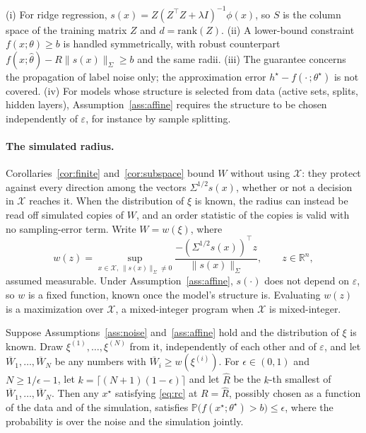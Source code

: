 \begin{remark}
(i) For ridge regression, $s(x) = Z(Z^\top Z + \lambda I)^{-1}\phi(x)$, so $S$
is the column space of the training matrix $Z$ and $d = \mathrm{rank}(Z)$.
(ii) A lower-bound constraint $f(x;\theta) \ge b$ is handled symmetrically,
with robust counterpart $f(x;\hat\theta) - R\|s(x)\|_\Sigma \ge b$ and the same
radii.
(iii) The guarantee concerns the propagation of label noise only; the
approximation error $h^\star - f(\cdot\,;\theta^\star)$ is not covered.
(iv) For models whose structure is selected from data (active sets, splits,
hidden layers), Assumption~\ref{ass:affine} requires the structure to be
chosen independently of $\varepsilon$, for instance by sample splitting.
\end{remark}

\paragraph{The simulated radius.}
Corollaries~\ref{cor:finite} and~\ref{cor:subspace} bound $W$ without using
$\mathcal{X}$: they protect against every direction among the vectors
$\Sigma^{1/2}s(x)$, whether or not a decision in $\mathcal{X}$ reaches it. When
the distribution of $\xi$ is known, the radius can instead be read off
simulated copies of $W$, and an order statistic of the copies is valid with no
sampling-error term. Write $W = w(\xi)$, where
\[
  w(z) = \sup_{x \in \mathcal{X},\, \|s(x)\|_\Sigma \neq 0}
    \frac{-(\Sigma^{1/2}s(x))^\top z}{\|s(x)\|_\Sigma},
  \qquad z \in \mathbb{R}^n ,
\]
assumed measurable. Under Assumption~\ref{ass:affine}, $s(\cdot)$ does not
depend on $\varepsilon$, so $w$ is a fixed function, known once the model's
structure is. Evaluating $w(z)$ is a maximization over $\mathcal{X}$, a
mixed-integer program when $\mathcal{X}$ is mixed-integer.

\begin{proposition}\label{prop:simulated}
Suppose Assumptions~\ref{ass:noise} and~\ref{ass:affine} hold and the
distribution of $\xi$ is known. Draw $\xi^{(1)},\dots,\xi^{(N)}$ from it,
independently of each other and of $\varepsilon$, and let
$\overline W_1,\dots,\overline W_N$ be any numbers with
$\overline W_i \ge w(\xi^{(i)})$. For $\epsilon \in (0,1)$ and
$N \ge 1/\epsilon - 1$, let $k = \lceil (N+1)(1-\epsilon) \rceil$ and let
$\hat R$ be the $k$-th smallest of $\overline W_1,\dots,\overline W_N$. Then
any $x^\star$ satisfying \eqref{eq:rc} at $R = \hat R$, possibly chosen as a
function of the data and of the simulation, satisfies
$\mathbb{P}\bigl(f(x^\star;\theta^\star) > b\bigr) \le \epsilon$, where the
probability is over the noise and the simulation jointly.
\end{proposition}

